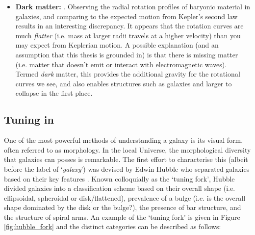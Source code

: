 \begin{itemize}
    \item \textbf{Dark matter:} . Observing the radial rotation profiles of baryonic material in galaxies, and comparing to the expected motion from Kepler's second law results in an interesting discrepancy. It appears that the rotation curves are much \textit{flatter} (i.e. mass at larger radii travels at a higher velocity) than you may expect from Keplerian motion. A possible explanation (and an assumption that this thesis is grounded in) is that there is missing matter (i.e. matter that doesn't emit or interact with electromagnetic waves). Termed \textit{dark} matter, this provides the additional gravity for the rotational curves we see, and also enables structures such as galaxies and larger to collapse in the first place.
\end{itemize}

\subsection{Tuning in}
One of the most powerful methods of understanding a galaxy is its visual form, often referred to as morphology. In the local Universe, the morphological diversity that galaxies can posses is remarkable. The first effort to characterise this (albeit before the label of `\textit{galaxy}') was devised by Edwin Hubble who separated galaxies based on their key features \citep{hubble1926, hubble1936}. Known colloquially as the `tuning fork', Hubble divided galaxies into a classification scheme based on their overall shape (i.e. ellipsoidal, spheroidal or disk/flattened), prevalence of a bulge (i.e. is the overall shape dominated by the disk or the bulge?), the presence of bar structure, and the structure of spiral arms. An example of the `tuning fork' is given in Figure \ref{fig:hubble_fork} and the distinct categories can be described as follows:

